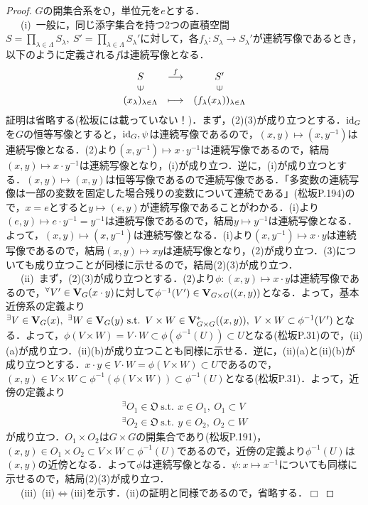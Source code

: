 \documentclass[a4paper,11pt]{jsarticle}
\newtheorem{proof}{証明}
\def\qed{\hfill $\Box$}
\newcommand{\st}{\mathrm{s.t.}\,}  %
\begin{document}
\begin{proof}
$G$の開集合系を$\mathfrak{O}$，単位元を$e$とする．\\
{\ }{\ }{\ }(i){\ }一般に，同じ添字集合を持つ2つの直積空間$S=\underset{\lambda\in\Lambda}{\prod}S_\lambda,{\ }S'=\underset{\lambda\in\Lambda}{\prod}S_\lambda'$に対して，各$f_\lambda:S_\lambda\to S_\lambda'$が連続写像であるとき，以下のように定義される$f$は連続写像となる．
\begin{eqnarray*}
\begin{array}{ccc}
S & \stackrel{f}{\longrightarrow} & S' \\
\rotatebox{90}{$\in$} & & \rotatebox{90}{$\in$} \\
(x_\lambda)_{\lambda\in\Lambda} & \longmapsto & (f_\lambda(x_\lambda))_{\lambda\in\Lambda}
\end{array}
\end{eqnarray*}
証明は省略する(松坂には載っていない！)．まず，(2)(3)が成り立つとする．${\rm id}_G$を$G$の恒等写像とすると，${\rm id}_G,\psi$は連続写像であるので，$(x,y)\mapsto (x,y^{-1})$は連続写像となる．(2)より$(x,y^{-1})\mapsto x\cdot y^{-1}$は連続写像であるので，結局$(x,y)\mapsto x\cdot y^{-1}$は連続写像となり，(i)が成り立つ．逆に，(i)が成り立つとする．$(x,y)\mapsto (x,y)$は恒等写像であるので連続写像である．「多変数の連続写像は一部の変数を固定した場合残りの変数について連続である」(松坂P.194)ので，$x=e$とすると$y\mapsto (e,y)$が連続写像であることがわかる．(i)より$(e,y)\mapsto e\cdot y^{-1}=y^{-1}$は連続写像であるので，結局$y\mapsto y^{-1}$は連続写像となる．よって，$(x,y)\mapsto (x,y^{-1})$は連続写像となる．(i)より$(x,y^{-1})\mapsto x\cdot y$は連続写像であるので，結局$(x,y)\mapsto xy$は連続写像となり，(2)が成り立つ．(3)についても成り立つことが同様に示せるので，結局(2)(3)が成り立つ．\\
{\ }{\ }{\ }(ii){\ }まず，(2)(3)が成り立つとする．(2)より$\phi:(x,y)\mapsto x\cdot y$は連続写像であるので，$^\forall V'\in {\bf V}_{G}(x\cdot y)$に対して$\phi^{-1}(V')\in {\bf V}_{G\times G}((x,y))$となる．よって，基本近傍系の定義より$^\exists V\in {\bf V}_G(x),{\ } ^\exists W\in {\bf V}_G(y){\ }\st{\ }V\times W \in {\bf V}^\ast_{G\times G}((x,y)),{\ }V\times W\subset \phi^{-1}(V')$となる．よって，$\phi(V\times W)=V\cdot W\subset \phi(\phi^{-1}(U))\subset U$となる(松坂P.31)ので，(ii)(a)が成り立つ．(ii)(b)が成り立つことも同様に示せる．逆に，(ii)(a)と(ii)(b)が成り立つとする．$x\cdot y\in V\cdot W=\phi(V\times W)\subset U$であるので，$(x,y)\in V\times W \subset \phi^{-1}(\phi(V\times W))\subset \phi^{-1}(U)$となる(松坂P.31)．よって，近傍の定義より
\begin{eqnarray*}
^\exists O_1\in\mathfrak{O}{\ }\st{\ }x\in O_1,{\ }O_1\subset V \\
^\exists O_2\in\mathfrak{O}{\ }\st{\ }y\in O_2,{\ }O_2\subset W
\end{eqnarray*}
が成り立つ．$O_1\times O_2$は$G\times G$の開集合であり(松坂P.191)，$(x,y)\in O_1\times O_2\subset V\times W\subset \phi^{-1}(U)$であるので，近傍の定義より$\phi^{-1}(U)$は$(x,y)$の近傍となる．よって$\phi$は連続写像となる．$\psi:x\mapsto x^{-1}$についても同様に示せるので，結局(2)(3)が成り立つ．\\
{\ }{\ }{\ }(iii){\ }(ii)$\Longleftrightarrow$(iii)を示す．(ii)の証明と同様であるので，省略する．\qed
\end{proof}
\end{document}
